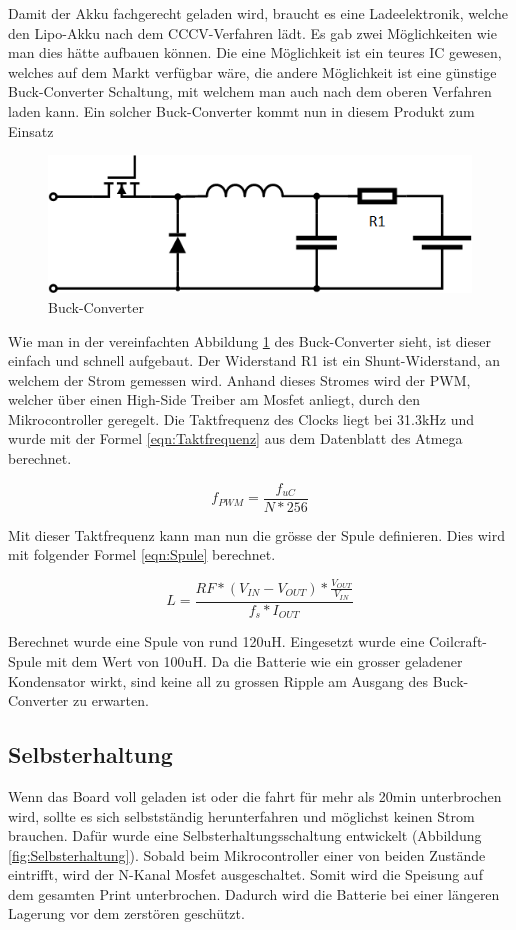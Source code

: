 Damit der Akku fachgerecht geladen wird, braucht es eine Ladeelektronik, welche den Lipo-Akku nach dem CCCV-Verfahren lädt. Es gab zwei Möglichkeiten wie man dies hätte aufbauen können. Die eine Möglichkeit ist ein teures IC gewesen, welches auf dem Markt verfügbar wäre, die andere Möglichkeit ist eine günstige Buck-Converter Schaltung, mit welchem man auch nach dem oberen Verfahren laden kann. Ein solcher Buck-Converter kommt nun in diesem Produkt zum Einsatz

\begin{figure} [H]
	\centering
	\includegraphics[width=0.6\linewidth]{images/Buck_Converter}
	\caption{Buck-Converter}
	\label{fig:Buck_Converter}
\end{figure}

Wie man in der vereinfachten Abbildung \ref{fig:Buck_Converter} des Buck-Converter sieht, ist dieser einfach und schnell aufgebaut. Der Widerstand R1 ist ein Shunt-Widerstand, an welchem der Strom gemessen wird. Anhand dieses Stromes wird der PWM, welcher über einen High-Side Treiber am Mosfet anliegt, durch den Mikrocontroller geregelt. Die Taktfrequenz des Clocks liegt bei 31.3kHz und wurde mit der Formel \eqref{eqn:Taktfrequenz} aus dem Datenblatt des Atmega berechnet.

\begin{equation}
f_{ PWM }=\frac { { f }_{ uC } }{ N*256 } 
\label{eqn:Taktfrequenz}
\end{equation}

Mit dieser Taktfrequenz kann man nun die grösse der Spule definieren. Dies wird mit folgender Formel \eqref{eqn:Spule} berechnet.

\begin{equation}
L=\frac { RF*\left( { V }_{ IN }-{ V }_{ OUT } \right) *\frac { { V }_{ OUT } }{ { V }_{ IN } }  }{ { f }_{ s }*{ I }_{ OUT } }  
\label{eqn:Spule}
\end{equation}

Berechnet wurde eine Spule von rund 120uH. Eingesetzt wurde eine Coilcraft-Spule mit dem Wert von 100uH. Da die Batterie wie ein grosser geladener Kondensator wirkt, sind keine all zu grossen Ripple am Ausgang des Buck-Converter zu erwarten.

\subsection*{Selbsterhaltung}
Wenn das Board voll geladen ist oder die fahrt für mehr als 20min unterbrochen wird, sollte es sich selbstständig herunterfahren und möglichst keinen Strom brauchen. Dafür wurde eine Selbsterhaltungsschaltung entwickelt (Abbildung \ref{fig:Selbsterhaltung}). Sobald beim Mikrocontroller einer von beiden Zustände eintrifft, wird der N-Kanal Mosfet ausgeschaltet. Somit wird die Speisung auf dem gesamten Print unterbrochen. Dadurch wird die Batterie bei einer längeren Lagerung vor dem zerstören geschützt.


